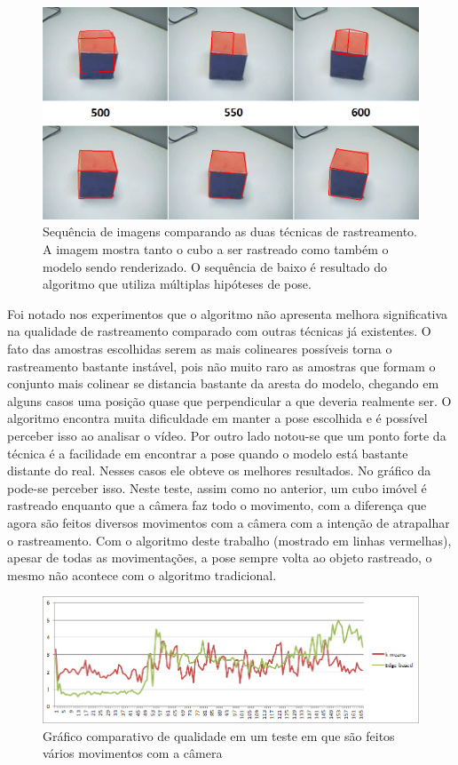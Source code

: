 \begin{figure}[!t]
\centering\includegraphics[width=\textwidth]{monografia/sequencia_cubo_real}
\caption{Sequência de imagens comparando as duas técnicas de rastreamento. A imagem mostra tanto o cubo a ser rastreado como também o modelo sendo renderizado. O sequência de baixo é resultado do algoritmo que utiliza múltiplas hipóteses de pose.}
\label{sequencia_cubo_real}
\end{figure}

Foi notado nos experimentos que o algoritmo não apresenta melhora significativa na qualidade de rastreamento comparado com outras técnicas já existentes. O fato das amostras escolhidas serem as mais colineares possíveis torna o rastreamento bastante instável, pois não muito raro as amostras que formam o conjunto mais colinear se distancia bastante da aresta do modelo, chegando em alguns casos uma posição quase que perpendicular a que deveria realmente ser. O algoritmo encontra muita dificuldade em manter a pose escolhida e é possível perceber isso ao analisar o vídeo. Por outro lado notou-se que um ponto forte da técnica é a facilidade em encontrar a pose quando o modelo está bastante distante do real. Nesses casos ele obteve os melhores resultados. No gráfico da  pode-se perceber isso. Neste teste, assim como no anterior, um cubo imóvel é rastreado enquanto que a câmera faz todo o movimento, com a diferença que agora são feitos diversos movimentos com a câmera com a intenção de atrapalhar o rastreamento. Com o algoritmo deste trabalho (mostrado em linhas vermelhas), apesar de todas as movimentações, a pose sempre volta ao objeto rastreado, o mesmo não acontece com o algoritmo tradicional.

\begin{figure}[!ht]
\centering\includegraphics[width=\textwidth]{monografia/qualidade_celine_boa}
\caption{Gráfico comparativo de qualidade em um teste em que são feitos vários movimentos com a câmera}
\label{qualidade_celine_boa}
\end{figure}
